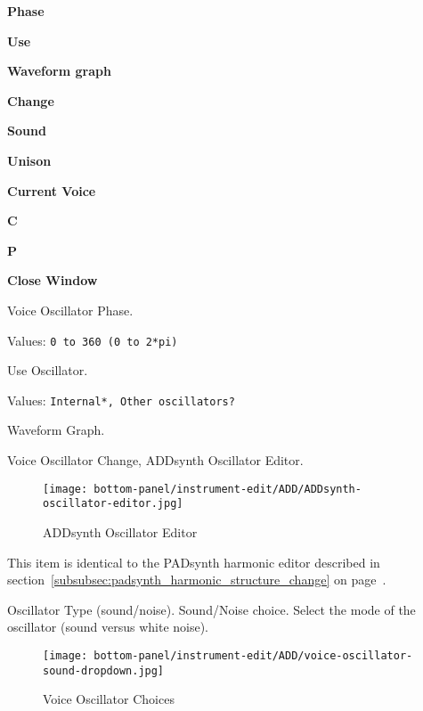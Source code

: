    \begin{enumber}
      \item \textbf{Phase}
      \item \textbf{Use}
      \item \textbf{Waveform graph}
      \item \textbf{Change}
      \item \textbf{Sound}
      \item \textbf{Unison}
      \item \textbf{Current Voice}
      \item \textbf{C}
      \item \textbf{P}
      \item \textbf{Close Window}
   \end{enumber}

   \setcounter{ItemCounter}{0}      %

   Voice Oscillator Phase.

   Values: \texttt{0 to 360 (0 to 2*pi)}

   Use Oscillator.

   Values: \texttt{Internal*, Other oscillators?}

   Waveform Graph.

   Voice Oscillator Change,
   ADDsynth Oscillator Editor.

\begin{figure}[H]
   \centering 
   \texttt{[image: bottom-panel/instrument-edit/ADD/ADDsynth-oscillator-editor.jpg]}
   \caption{ADDsynth Oscillator Editor}
   \label{fig:addsynth_oscillator_editor}
\end{figure}

   This item is identical to the PADsynth harmonic editor described in
   section~\ref{subsubsec:padsynth_harmonic_structure_change} on
   page~\pageref{subsubsec:padsynth_harmonic_structure_change}.

   Oscillator Type (sound/noise).
   Sound/Noise choice.
   Select the mode of the oscillator (sound versus white noise).

\begin{figure}[H]
   \centering 
   \texttt{[image: bottom-panel/instrument-edit/ADD/voice-oscillator-sound-dropdown.jpg]}
   \caption{Voice Oscillator Choices}
   \label{fig:voice_oscillator_choices}
\end{figure}

